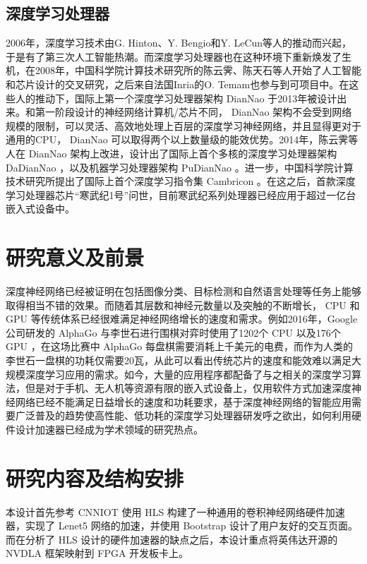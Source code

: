 \subsection{深度学习处理器}
2006年，深度学习技术由G. Hinton、Y. Bengio和Y. LeCun等人的推动而兴起，于是有了第三次人工智能热潮。而深度学习处理器也在这种环境下重新焕发了生机，在2008年，中国科学院计算技术研究所的陈云霁、陈天石等人开始了人工智能和芯片设计的交叉研究，之后来自法国Inria的O. Temam也参与到可项目中。在这些人的推动下，国际上第一个深度学习处理器架构 DianNao 于2013年被设计出来。和第一阶段设计的神经网络计算机/芯片不同， DianNao 架构不会受到网络规模的限制，可以灵活、高效地处理上百层的深度学习神经网络，并且显得更对于通用的CPU， DianNao\cite{10.1145/2654822.2541967} 可以取得两个以上数量级的能效优势。2014年，陈云霁等人在 DianNao 架构上改进，设计出了国际上首个多核的深度学习处理器架构 DaDianNao\cite{7011421} ，以及机器学习处理器架构 PuDianNao \cite{10.1145/2786763.2694358} 。进一步，中国科学院计算技术研究所提出了国际上首个深度学习指令集 Cambricon\cite{7551409} 。在这之后，首款深度学习处理器芯片“寒武纪1号”问世，目前寒武纪系列处理器已经应用于超过一亿台嵌入式设备中。

\section{研究意义及前景}

深度神经网络已经被证明在包括图像分类、目标检测和自然语言处理等任务上能够取得相当不错的效果。而随着其层数和神经元数量以及突触的不断增长， CPU 和 GPU 等传统体系已经很难满足神经网络增长的速度和需求。例如2016年，Google公司研发的 AlphaGo 与李世石进行围棋对弈时使用了1202个 CPU 以及176个 GPU ，在这场比赛中 AlphaGo 每盘棋需要消耗上千美元的电费，而作为人类的李世石一盘棋的功耗仅需要20瓦，从此可以看出传统芯片的速度和能效难以满足大规模深度学习应用的需求。如今，大量的应用程序都配备了与之相关的深度学习算法，但是对于手机、无人机等资源有限的嵌入式设备上，仅用软件方式加速深度神经网络已经不能满足日益增长的速度和功耗要求，基于深度神经网络的智能应用需要广泛普及的趋势使高性能、低功耗的深度学习处理器研发呼之欲出，如何利用硬件设计加速器已经成为学术领域的研究热点。

\section{研究内容及结构安排}

本设计首先参考 CNNIOT 使用 HLS 构建了一种通用的卷积神经网络硬件加速器，实现了 Lenet5 网络的加速，并使用 Bootstrap 设计了用户友好的交互页面。而在分析了 HLS 设计的硬件加速器的缺点之后，本设计重点将英伟达开源的 NVDLA 框架映射到 FPGA 开发板卡上。

